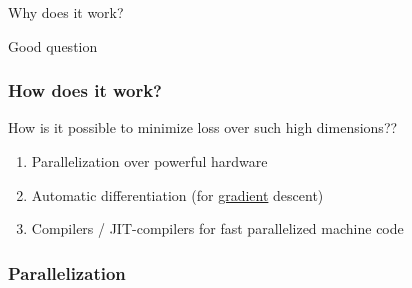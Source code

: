 \begin{frame}{Why does it work?}

    \pause
    Good question
    
\end{frame}


\begin{frame}
    \frametitle{How does it work?}
    
    How is it possible to minimize loss over such high dimensions??

        \vspace{0.5em}
        \vspace{0.5em}
        \vspace{0.5em}
        \vspace{0.5em}
        \pause

    \begin{enumerate}
        \item Parallelization over powerful hardware 
        \vspace{0.5em}
        \item Automatic differentiation (for \underline{gradient} descent)
        \vspace{0.5em}
        \item Compilers / JIT-compilers for fast parallelized machine code
    \end{enumerate}

\end{frame}

\begin{frame}[fragile]
    \frametitle{Parallelization}

    \begin{figure}
       \begin{center}
       \end{center}
    \end{figure}
    
\end{frame}



